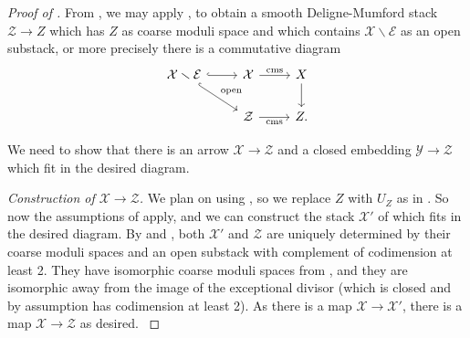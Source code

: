 \documentclass{amsart}
\newcommand{\cE}{\mathcal{E}}
\newcommand{\cX}{\mathcal{X}}
\newcommand{\cY}{\mathcal{Y}}
\newcommand{\cZ}{\mathcal{Z}}
\theoremstyle{definition}
\begin{document}
\begin{proof}[Proof of ]
From , we may apply , to obtain a smooth Deligne-Mumford stack $\cZ\to Z$ which has $Z$ as coarse moduli space and which contains $\cX \smallsetminus \cE$ as an open substack, or more precisely there is a commutative diagram 
$$ 
\begin{tikzcd}
\cX \smallsetminus \cE \arrow[r, hook] \arrow[rd, "{\rm open}", hook] & \cX \arrow[r, "{\rm cms}"]  & X \arrow[d] \\& \cZ \arrow[r, "{\rm cms}"'] & Z.          
\end{tikzcd}$$

We need to show that there is an arrow $\cX\to \cZ$ and a closed embedding $\cY\to \cZ$ which fit in the desired diagram.

    \textit{Construction of $\cX\to \cZ$.} We plan on using , so we replace $Z$ with $U_Z$ as in . So now the assumptions of  apply, and we can construct the stack $\cX'$ of   which fits in the desired diagram. {By  and , both $\cX'$ and $\cZ$ are uniquely determined by their coarse moduli
    spaces and an open substack with complement of codimension at least 2. They have isomorphic coarse moduli spaces from , and they are isomorphic away from the image of the exceptional divisor (which is closed and by assumption has codimension at least 2). As there is a map $\cX\to \cX'$, there is a map $\cX\to \cZ$ as desired. }
    
    
    

\end{proof}
\end{document}
